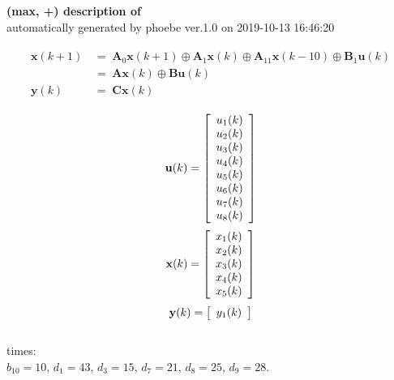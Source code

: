 \documentclass[11pt, a4paper, fleqn]{article}
\begin{document}
\noindent
\textbf{(max, +) description of} \texttt{\currfilebase} \\
automatically generated by phoebe ver.1.0 on 2019-10-13 16:46:20 

\begin{align}\begin{split}
\mathbf{x}(k+1) & \, = \; \mathbf{A}_{0}\mathbf{x}(k+1) \oplus \mathbf{A}_{1}\mathbf{x}(k) \oplus \mathbf{A}_{11}\mathbf{x}(k-10) \oplus \mathbf{B}_{1}\mathbf{u}(k)\\
& \, = \; \mathbf{Ax}(k) \oplus \mathbf{Bu}(k)\\
\mathbf{y}(k) & \, = \; \mathbf{Cx}(k)
\end{split}\end{align}

\begin{equation*}
\mathbf{u}(k) = 
\left[\begin{array}{*{20}c}
  u_1(k) \\
  u_2(k) \\
  u_3(k) \\
  u_4(k) \\
  u_5(k) \\
  u_6(k) \\
  u_7(k) \\
  u_8(k) \\
\end{array}\right]
\end{equation*}
\begin{equation*}
\mathbf{x}(k) = 
\left[\begin{array}{*{20}c}
  x_1(k) \\
  x_2(k) \\
  x_3(k) \\
  x_4(k) \\
  x_5(k) \\
\end{array}\right]
\end{equation*}
\begin{equation*}
\mathbf{y}(k) = 
\left[\begin{array}{*{20}c}
  y_1(k) \\
\end{array}\right]
\end{equation*}
\noindent\\
times:\\
$b_10 = 10$, $d_1 = 43$, $d_3 = 15$, $d_7 = 21$, $d_8 = 25$, $d_9 = 28$.\\
\\
\end{document}
